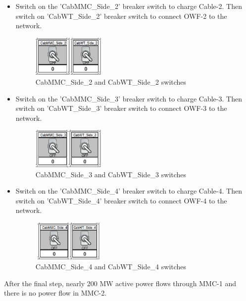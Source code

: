 \begin{itemize}
    \item Switch on the 'CabMMC\_Side\_2' breaker switch to charge Cable-2. Then switch on 'CabWT\_Side\_2' breaker switch to connect \gls{OWF}-2 to the network.
 
     \begin{figure}[H]
\centering
    \includegraphics[height = 2cm,width = 3.5cm]{Diagrams/Appendix_C/Cab_2.PNG}
    \caption{CabMMC\_Side\_2 and CabWT\_Side\_2 switches}
    \label{fig:Cab_2}
\end{figure}
    
    \item Switch on the 'CabMMC\_Side\_3' breaker switch to charge Cable-3. Then switch on 'CabWT\_Side\_3' breaker switch to connect \gls{OWF}-3 to the network.
    
        \begin{figure}[H]
\centering
    \includegraphics[height = 2cm,width = 3.5cm]{Diagrams/Appendix_C/Cab_3.PNG}
    \caption{CabMMC\_Side\_3 and CabWT\_Side\_3 switches}
    \label{fig:Cab_3}
\end{figure}

    \item Switch on the 'CabMMC\_Side\_4' breaker switch to charge Cable-4. Then switch on 'CabWT\_Side\_4' breaker switch to connect \gls{OWF}-4 to the network.
    
        \begin{figure}[H]
\centering
    \includegraphics[height = 2cm,width = 3.5cm]{Diagrams/Appendix_C/Cab_4.PNG}
    \caption{CabMMC\_Side\_4 and CabWT\_Side\_4 switches}
    \label{fig:Cab_4}
\end{figure}

\end{itemize}
After the final step, nearly 200 MW active power flows through \gls{MMC}-1 and there is no power flow in \gls{MMC}-2.


